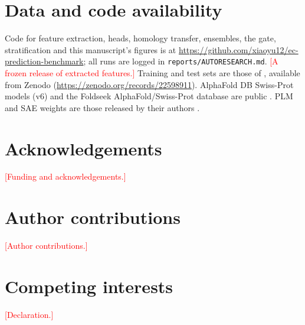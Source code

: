 \documentclass[11pt]{article}
\newcommand{\todo}[1]{\textcolor{red}{[#1]}}
\begin{document}
\section*{Data and code availability}
Code for feature extraction, heads, homology transfer, ensembles, the gate, stratification and this manuscript's figures
is at \url{https://github.com/xiaoyu12/ec-prediction-benchmark}; all runs are logged in
\texttt{reports/AUTORESEARCH.md}. \todo{A frozen release of extracted features.} Training and
test sets are those of \cite{milbc}, available from Zenodo (\url{https://zenodo.org/records/22598911}). AlphaFold DB
Swiss-Prot models (v6) and the Foldseek AlphaFold/Swiss-Prot database are public \cite{foldseek,afdb2022}. PLM and SAE
weights are those released by their authors \cite{esm2,esmc,prottrans,prostt5,saprot,biohubsae}.

\section*{Acknowledgements}
\todo{Funding and acknowledgements.}

\section*{Author contributions}
\todo{Author contributions.}

\section*{Competing interests}
\todo{Declaration.}
\end{document}
